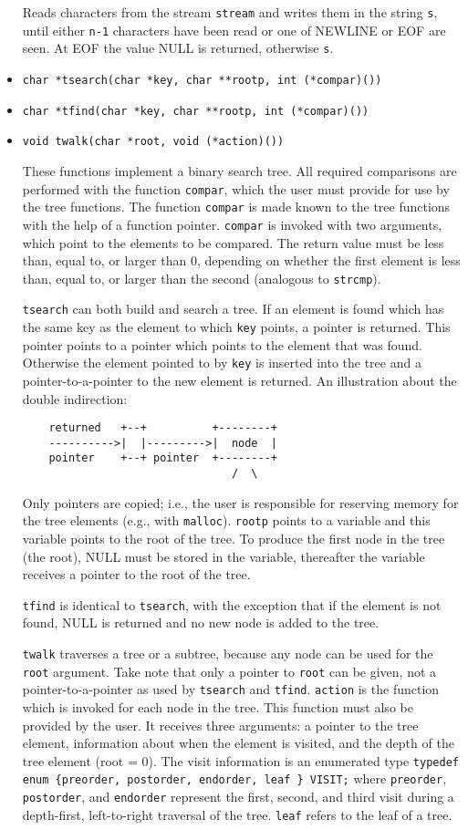 \begin{itemize}
Reads characters from the stream {\tt stream} and writes them in the
string {\tt s}, until either {\tt n-1} characters have been read or
one of NEWLINE or EOF are seen.
At EOF the value NULL is returned, otherwise {\tt s}.

\item {\tt char *tsearch(char *key, char **rootp, int (*compar)())}
\item {\tt char *tfind(char *key, char **rootp, int (*compar)())}
\item {\tt void twalk(char *root, void (*action)())}

These functions implement a binary search tree.  All required
comparisons are performed with the function {\tt compar}, which the
user must provide for use by the tree functions.
The function {\tt compar} is made known to the tree functions with the
help of a function pointer.  
{\tt compar} is invoked with two arguments, which point to the
elements to be compared.
The return value must be less than, equal to, or larger than 0,
depending on whether the first element is less than, equal to, or
larger than the second (analogous to {\tt strcmp}).

{\tt tsearch} can both build and search a tree.
If an element is found which has the same key as the element to which
{\tt key} points, a pointer is returned.  This pointer points to a
pointer which points to the element that was found.  
Otherwise the element pointed to by {\tt key} is inserted into the
tree and a pointer-to-a-pointer to the new element is returned.
An illustration about the double indirection:
\begin{verbatim}
    returned   +--+          +--------+ 
    ---------->|  |--------->|  node  |
    pointer    +--+ pointer  +--------+ 
                                /  \
\end{verbatim}
Only pointers are copied; i.e., the user is responsible for reserving
memory for the tree elements (e.g., with {\tt malloc}).
{\tt rootp} points to a variable and this variable points to the root
of the tree.
To produce the first node in the tree (the root), NULL must be stored
in the variable, thereafter the variable receives a pointer to the
root of the tree.

{\tt tfind} is identical to {\tt tsearch}, with the exception that if
the element is not found, NULL is returned and no new node is added to
the tree. 

{\tt twalk} traverses a tree or a subtree, because any node can be
used for the {\tt root} argument.  Take note that only a pointer to
{\tt root} can be given, not a pointer-to-a-pointer as used by
{\tt tsearch} and {\tt tfind}.
{\tt action} is the function which is invoked for each node in the
tree.
This function must also be provided by the user.  It receives
three arguments: a pointer to the tree element, information about when
the element is visited, and the depth of the tree element (root = 0).
The visit information is an enumerated type  {\tt typedef enum
\{preorder, postorder, endorder, leaf \} VISIT;} where {\tt preorder},
{\tt postorder}, and {\tt endorder} represent the first, second, and
third visit during a depth-first, left-to-right traversal of the
tree. 
{\tt leaf} refers to the leaf of a tree.


\end{itemize}
